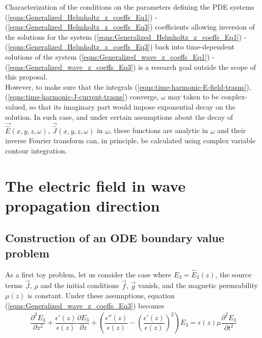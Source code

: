 \documentclass[12pt,twoside]{report}
\begin{document}
Characterization of the conditions on the parameters defining the PDE systems (\ref{eqns:Generalized_Helmholtz_z_coeffs_Eq1}) -
(\ref{eqns:Generalized_Helmholtz_z_coeffs_Eq3}) coefficients allowing inversion of the solutions for the system (\ref{eqns:Generalized_Helmholtz_z_coeffs_Eq1}) -
(\ref{eqns:Generalized_Helmholtz_z_coeffs_Eq3}) back into time-dependent solutions of the system (\ref{eqns:Generalized_wave_z_coeffs_Eq1}) -   (\ref{eqns:Generalized_wave_z_coeffs_Eq3})
is a research goal outside the scope of this proposal. \\ However, to make sure that the integrals (\ref{eqns:time-harmonic-E-field-trasns}), (\ref{eqns:time-harmonic-J-current-trasns}) converge, $\omega$ may taken to be conplex-valued, so that its imaginary part would impose exponential decay on the solution. In such case, and under certain assumptions about the decay of $\overrightarrow{\hat{E}}(x,y,z,\omega)$, $\overrightarrow{\hat{J}}(x,y,z,\omega)$ in $\omega$, these functions are analytic in $\omega$ and their inverse Fourier transform can, in principle, be calculated using complex variable contour integration.

\chapter{The electric field in wave propagation direction}

\section{Construction of an ODE boundary value problem}
As a first toy problem, let us consider the case where $E_3 = \hat{E}_3(z)$, the source terms $\overrightarrow{J}$, $\rho$ and the initial conditions $\overrightarrow{f}$, $\overrightarrow{g}$ vanish, and the magnetic permeability $\mu(z)$ is constant.  Under these assumptions, equation (\ref{eqns:Generalized_wave_z_coeffs_Eq3}) becomes
\begin{align}
\label{eqns:1-D-spatio-temporal-E3_z}
\dfrac{\partial^2 E_3}{\partial z^2} + \dfrac{\epsilon'(z)}{\epsilon(z)}\dfrac{\partial E_3}{\partial z} + \left( \dfrac{\epsilon''(z)}{\epsilon(z)}-\left( \dfrac{\epsilon'(z)}{\epsilon(z)}\right)^2 \right)E_3   = \epsilon(z)\mu\dfrac{\partial ^2 E_3}{\partial t^2}
\end{align}
\end{document}

